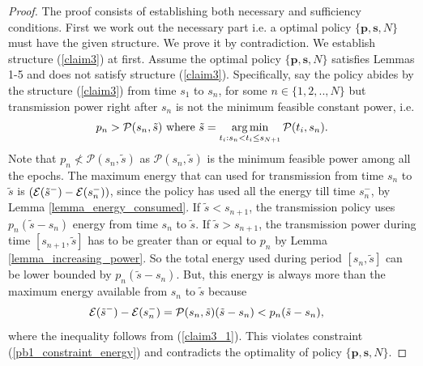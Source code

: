 \begin{proof}
The proof consists of establishing both necessary and sufficiency conditions. First we work out the necessary part i.e. a optimal policy $\{\textbf{p},\textbf{s},N\}$ must have the given structure. We prove it by contradiction. We establish structure (\ref{claim3}) at first. Assume the optimal policy $\{\textbf{p},\textbf{s},N\}$ satisfies Lemmas 1-5 and does not satisfy structure (\ref{claim3}). Specifically, say the policy abides by the  structure (\ref{claim3}) from time $s_{1}$ to $s_n$, for some $n\in \{1,2,..,N\}$ but transmission power right after $s_n$ is not the minimum feasible constant power, i.e.
\begin{align}
p_n>\mathcal{P}(s_n,\tilde{s})\text{ where } \tilde{s}=\argmin_{t_i: s_n < t_i \le s_{N+1}} \mathcal{P}(t_i,s_n).\label{claim3_1}
\end{align}
Note that $p_n\nless \mathcal{P}(s_n,\tilde{s})$ as $\mathcal{P}(s_n,\tilde{s})$ is the minimum feasible power among all the epochs. The maximum energy that can used for transmission from time $s_{n}$ to $\tilde{s}$ is $\left(\mathcal{E}(\tilde{s}^-)-\mathcal{E}(s_{n}^-)\right)$, since the policy has used all the energy till time $s_{n}^-$, by Lemma \ref{lemma_energy_consumed}. If $\tilde{s}<s_{n+1}$, the transmission policy uses $p_n(\tilde{s}-s_{n})$ energy from time $s_n$ to $\tilde{s}$. If $\tilde{s}>s_{n+1}$, the transmission power during time $[s_{n+1},\tilde{s}]$ has to be greater than or equal to $p_n$ by Lemma \ref{lemma_increasing_power}. So the total energy used during period $[s_n,\tilde{s}]$ can be lower bounded by $p_n(\tilde{s}-s_{n})$. But, this energy is always more than the maximum energy available from $s_{n}$ to $\tilde{s}$ because
\begin{align}
&\nonumber\mathcal{E}(\tilde{s}^-)-\mathcal{E}(s_{n}^-)=\mathcal{P}(s_n,\tilde{s})(\tilde{s}-s_{n})<p_n(\tilde{s}-s_{n}),
\end{align}
where the inequality follows from (\ref{claim3_1}). This violates constraint (\ref{pb1_constraint_energy}) and contradicts the optimality of policy $\{\textbf{p},\textbf{s},N\}$.
 

\end{proof}

